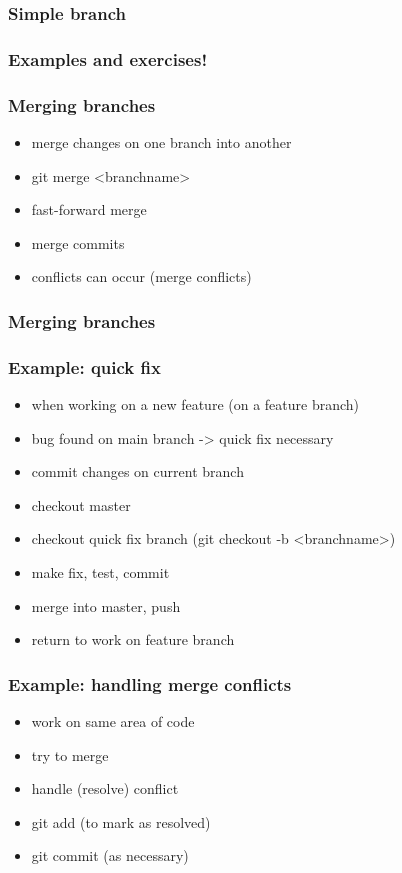 \documentclass{git_course}
\begin{document}
\begin{frame}
\frametitle{Simple branch}
\begin{center}
    \resizebox{!}{0.7\textheight}{
        
    }
\end{center}
\end{frame}

\begin{frame}
\frametitle{Examples and exercises!}
\end{frame}

\begin{frame}
\frametitle{Merging branches}
\begin{itemize}
    \item merge changes on one branch into another
    \item git merge <branchname>
    \item fast-forward merge
    \item merge commits
    \item conflicts can occur (merge conflicts)
\end{itemize}
\end{frame}

\begin{frame}
\frametitle{Merging branches}
\begin{center}
    \resizebox{!}{0.7\textheight}{
        
    }
\end{center}
\end{frame}

\begin{frame}
\frametitle{Example: quick fix}
\begin{itemize}
    \item when working on a new feature (on a feature branch)
    \item bug found on main branch -> quick fix necessary
    \item commit changes on current branch
    \item checkout master
    \item checkout quick fix branch (git checkout -b <branchname>)
    \item make fix, test, commit
    \item merge into master, push
    \item return to work on feature branch
\end{itemize}
\end{frame}

\begin{frame}
\frametitle{Example: handling merge conflicts}
\begin{itemize}
    \item work on same area of code
    \item try to merge
    \item handle (resolve) conflict
    \item git add (to mark as resolved)
    \item git commit (as necessary)
\end{itemize}
\end{frame}
\end{document}
